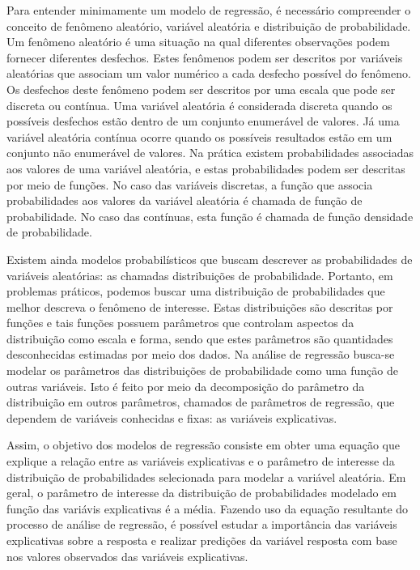 Para entender minimamente um modelo de regressão, é necessário compreender o conceito de fenômeno aleatório, variável aleatória e distribuição de probabilidade. Um fenômeno aleatório é uma situação na qual diferentes observações podem fornecer diferentes desfechos. Estes fenômenos podem ser descritos por variáveis aleatórias que associam um valor numérico a cada desfecho possível do fenômeno. Os desfechos deste fenômeno podem ser descritos por uma escala que pode ser discreta ou contínua. Uma variável aleatória é considerada discreta quando os possíveis desfechos estão dentro de um conjunto enumerável de valores. Já uma variável aleatória contínua ocorre quando os possíveis resultados estão em um conjunto não enumerável de valores. Na prática existem probabilidades associadas aos valores de uma variável aleatória, e estas probabilidades podem ser descritas por meio de funções. No caso das variáveis discretas, a função que associa probabilidades aos valores da variável aleatória é chamada de função de probabilidade. No caso das contínuas, esta função é chamada de função densidade de probabilidade.

Existem ainda modelos probabilísticos que buscam descrever as probabilidades de variáveis aleatórias: as chamadas distribuições de probabilidade. Portanto, em problemas práticos, podemos buscar uma distribuição de probabilidades que melhor descreva o fenômeno de interesse. Estas distribuições são descritas por funções e tais funções possuem parâmetros que controlam aspectos da distribuição como escala e forma, sendo que estes parâmetros são quantidades desconhecidas estimadas por meio dos dados. Na análise de regressão busca-se modelar os parâmetros das distribuições de probabilidade como uma função de outras variáveis. Isto é feito por meio da decomposição do parâmetro da distribuição em outros parâmetros, chamados de parâmetros de regressão, que dependem de variáveis conhecidas e fixas: as variáveis explicativas.  

Assim, o objetivo dos modelos de regressão consiste em obter uma equação que explique a relação entre as variáveis explicativas e o parâmetro de interesse da distribuição de probabilidades selecionada para modelar a variável aleatória. Em geral, o parâmetro de interesse da distribuição de probabilidades modelado em função das variávis explicativas é a média. Fazendo uso da equação resultante do processo de análise de regressão, é possível estudar a importância das variáveis explicativas sobre a resposta e realizar predições da variável resposta com base nos valores observados das variáveis explicativas. 

